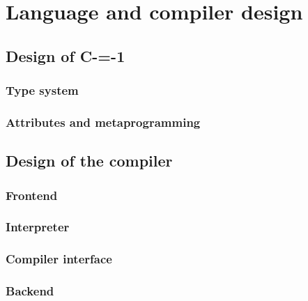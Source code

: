 \section{Language and compiler design}

\subsection{Design of C-=-1}

\subsubsection{Type system}

\subsubsection{Attributes and metaprogramming}

\subsection{Design of the compiler}

\subsubsection{Frontend}

\subsubsection{Interpreter}

\subsubsection{Compiler interface}

\subsubsection{Backend}
